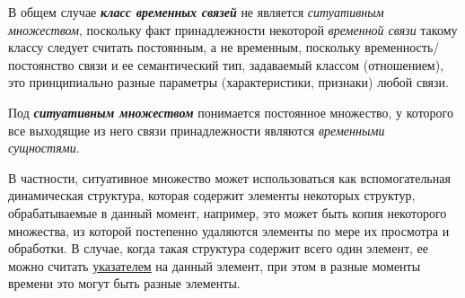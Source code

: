 В общем случае \textbf{\textit{класс временных связей}} не является \textit{ситуативным множеством}, поскольку факт принадлежности некоторой \textit{временной связи} такому классу следует считать постоянным, а не временным, поскольку временность/постоянство связи и ее семантический тип, задаваемый классом (отношением), это принципиально разные параметры (характеристики, признаки) любой связи.
		
\begin{SCn}
		
		
\begin{scnsubdividing}
\end{scnsubdividing}
		
\end{SCn}

Под \textbf{\textit{ситуативным множеством}} понимается постоянное множество, у которого все выходящие из него связи принадлежности являются \textit{временными сущностями}.
			
В частности, ситуативное множество может использоваться как вспомогательная динамическая структура, которая содержит элементы некоторых структур, обрабатываемые в данный момент, например, это может быть копия некоторого множества, из которой постепенно удаляются элементы по мере их просмотра и обработки. В случае, когда такая структура содержит всего один элемент, ее можно считать \underline{указателем} на данный элемент, при этом в разные моменты времени это могут быть разные элементы.

